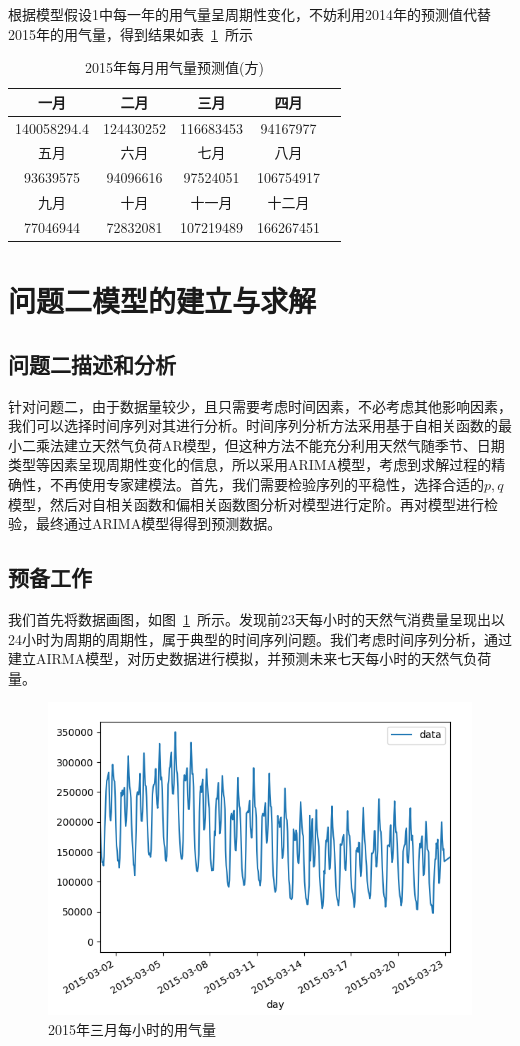 \documentclass{whutmod}
\begin{document}
	根据模型假设1中每一年的用气量呈周期性变化，不妨利用2014年的预测值代替2015年的用气量，得到结果如表~\ref{tab000}~所示
	\begin{table}[H]
		\caption{2015年每月用气量预测值(方)}\label{tab000} \centering
		\begin{tabular}{ccccc}
			\toprule[1.5pt]
			一月 & 二月 & 三月 & 四月 \\
			\hline
			140058294.4&124430252&116683453&94167977\\
			\hline
			五月 & 六月 & 七月&八月\\
			\hline
			93639575&94096616&97524051&106754917\\
			\hline
			九月 & 十月 &十一月 & 十二月 \\
			\hline
			77046944&72832081&107219489&166267451\\
			\bottomrule[1.5pt]
		\end{tabular}
	\end{table}
	
	\section{问题二模型的建立与求解}
	\subsection{问题二描述和分析}
针对问题二，由于数据量较少，且只需要考虑时间因素，不必考虑其他影响因素，我们可以选择时间序列对其进行分析。时间序列分析方法采用基于自相关函数的最小二乘法建立天然气负荷AR模型，但这种方法不能充分利用天然气随季节、日期类型等因素呈现周期性变化的信息\parencite{刘涵2004基于最小二乘支持向量机的天然气负荷预测}，所以采用ARIMA模型，考虑到求解过程的精确性，不再使用专家建模法。首先，我们需要检验序列的平稳性，选择合适的$p,q$模型，然后对自相关函数和偏相关函数图分析对模型进行定阶。再对模型进行检验，最终通过ARIMA模型得得到预测数据。
	\subsection{预备工作}
	我们首先将数据画图，如图~\ref{img003}~所示。发现前23天每小时的天然气消费量呈现出以24小时为周期的周期性，属于典型的时间序列问题。我们考虑时间序列分析，通过建立AIRMA模型，对历史数据进行模拟，并预测未来七天每小时的天然气负荷量。
	\begin{figure}[H]
		\centering
		\includegraphics[width=.45\textwidth]{figures/3.png}
		\caption{2015年三月每小时的用气量}\label{img003}
	\end{figure}	
\end{document}
